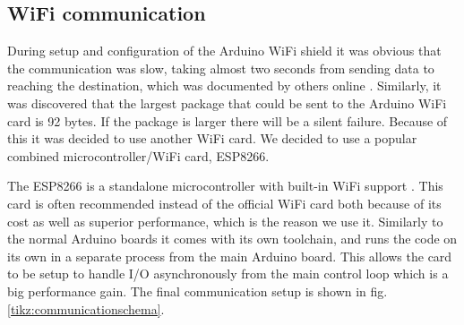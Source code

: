 \documentclass[11pt]{article}
\begin{document}
\subsection{WiFi communication}
During setup and configuration of the Arduino WiFi shield it was obvious that
the communication was slow, taking almost two seconds from sending data to
reaching the destination, which was documented by others online
\cite{wificard1,wificard2}. Similarly, it was discovered that the largest
package that could be sent to the Arduino WiFi card is 92 bytes. If the package
is larger there will be a silent failure. Because of this it was decided to use
another WiFi card. We decided to use a popular combined microcontroller/WiFi
card, ESP8266. \par

The ESP8266 is a standalone microcontroller with built-in WiFi support
\cite{ESP8266}. This card is often recommended instead of the official WiFi card
both because of its cost as well as superior performance, which is the reason we
use it. Similarly to the normal Arduino boards it comes with its own toolchain,
and runs the code on its own in a separate process from the main Arduino
board. This allows the card to be setup to handle I/O asynchronously from the
main control loop which is a big performance gain. The final communication setup
is shown in fig. \vref{tikz:communicationschema}.\par
\end{document}
